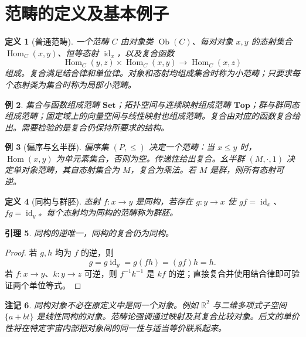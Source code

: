 \documentclass[12pt,oneside,openany,fontset=none]{ctexbook}
\theoremstyle{cn}
\newtheorem{definition}{定义}[chapter]
\newtheorem{example}[definition]{例}
\newtheorem{lemma}[definition]{引理}
\newtheorem{remark}[definition]{注记}
\numberwithin{equation}{chapter}
\newcommand{\Set}{\mathbf{Set}}
\newcommand{\Top}{\mathbf{Top}}
\newcommand{\id}{\operatorname{id}}
\newcommand{\Hom}{\operatorname{Hom}}
\newcommand{\Ob}{\operatorname{Ob}}
\newcommand{\R}{\mathbb R}
\begin{document}
\section{范畴的定义及基本例子}
\begin{definition}[普通范畴]
一个范畴 $C$ 由对象类 $\Ob(C)$、每对对象 $x,y$ 的态射集合 $\Hom_C(x,y)$、恒等态射 $\id_x$，以及复合函数
\[
\Hom_C(y,z)\times\Hom_C(x,y)\to\Hom_C(x,z)
\]
组成。复合满足结合律和单位律。对象和态射均组成集合时称为小范畴；只要求每个态射类为集合时称为局部小范畴。
\end{definition}
\begin{example}
集合与函数组成范畴 $\Set$；拓扑空间与连续映射组成范畴 $\Top$；群与群同态组成范畴；固定域上的向量空间与线性映射也组成范畴。复合由对应的函数复合给出。需要检验的是复合仍保持所要求的结构。
\end{example}
\begin{example}[偏序与幺半群]
偏序集 $(P,\le)$ 决定一个范畴：当 $x\le y$ 时，$\Hom(x,y)$ 为单元素集合，否则为空。传递性给出复合。幺半群 $(M,\cdot,1)$ 决定单对象范畴，其自态射集合为 $M$，复合为乘法。若 $M$ 是群，则所有态射可逆。
\end{example}
\begin{definition}[同构与群胚]
态射 $f:x\to y$ 是同构，若存在 $g:y\to x$ 使 $gf=\id_x$、$fg=\id_y$。每个态射均为同构的范畴称为群胚。
\end{definition}
\begin{lemma}
同构的逆唯一，同构的复合仍为同构。
\end{lemma}
\begin{proof}
若 $g,h$ 均为 $f$ 的逆，则
\[
g=g\id_y=g(fh)=(gf)h=h.
\]
若 $f:x\to y$、$k:y\to z$ 可逆，则 $f^{-1}k^{-1}$ 是 $kf$ 的逆；直接复合并使用结合律即可验证两个单位等式。
\end{proof}
\begin{remark}
同构对象不必在原定义中是同一个对象。例如 $\R^2$ 与二维多项式子空间 $\{a+bt\}$ 是线性同构的对象。范畴论强调通过映射及其复合比较对象。后文的单价性将在特定宇宙内部把对象间的同一性与适当等价联系起来。
\end{remark}
\end{document}

